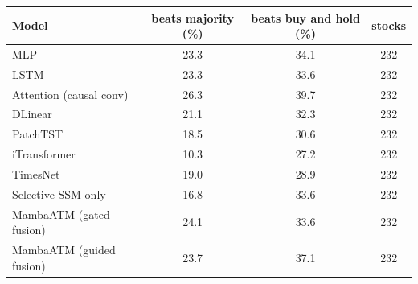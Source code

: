 {\footnotesize
\setlength{\tabcolsep}{3pt}
\begin{tabular}{lccc}
\toprule
\textbf{Model} & \textbf{beats majority (\%)} & \textbf{beats buy and hold (\%)} & \textbf{stocks} \\
\midrule
MLP & 23.3 & 34.1 & 232 \\
LSTM & 23.3 & 33.6 & 232 \\
Attention (causal conv) & 26.3 & 39.7 & 232 \\
DLinear & 21.1 & 32.3 & 232 \\
PatchTST & 18.5 & 30.6 & 232 \\
iTransformer & 10.3 & 27.2 & 232 \\
TimesNet & 19.0 & 28.9 & 232 \\
Selective SSM only & 16.8 & 33.6 & 232 \\
MambaATM (gated fusion) & 24.1 & 33.6 & 232 \\
MambaATM (guided fusion) & 23.7 & 37.1 & 232 \\
\bottomrule
\end{tabular}
}

